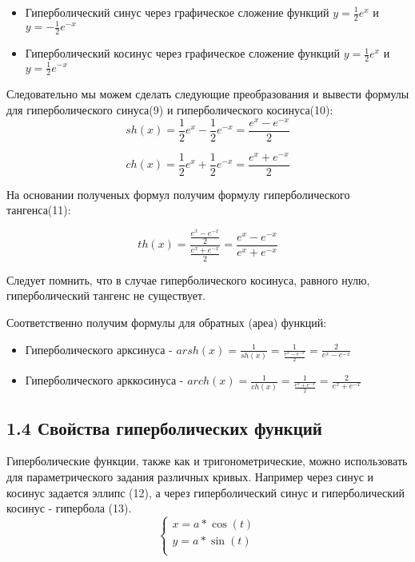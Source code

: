 \documentclass{article}
\begin{document}
\begin{itemize}
    \item Гиперболический синус через графическое сложение функций $y=\frac{1}{2}e^x$ и $y=-\frac{1}{2}e^{-x}$
    \item Гиперболический косинус через графическое сложение функций $y=\frac{1}{2}e^x$ и $y=\frac{1}{2}e^{-x}$
\end{itemize}

Следовательно мы можем сделать следующие преобразования и вывести формулы для гиперболического синуса(9) и гиперболического косинуса(10):
\begin{equation}
    sh(x) = \frac{1}{2}e^x - \frac{1}{2}e^{-x} = \frac{e^x-e^{-x}}{2}
 \end{equation}

 \begin{equation}
    ch(x) = \frac{1}{2}e^x + \frac{1}{2}e^{-x} = \frac{e^x+e^{-x}}{2}
 \end{equation}

 На основании полученых формул получим формулу гиперболического тангенса(11):

 \begin{equation}
    th(x) = \frac{\frac{e^x-e^{-x}}{2}}{\frac{e^x+e^{-x}}{2}} = \frac{e^x-e^{-x}}{e^x+e^{-x}}
 \end{equation}

Следует помнить, что в случае гиперболического косинуса, равного нулю, гиперболический тангенс не существует.

Соответственно получим формулы для обратных (ареа) функций:

\begin{itemize}
    \item Гиперболического арксинуса - $arsh(x) = \frac{1}{sh(x)} = \frac{1}{\frac{e^x-e^{-x}}{2}} = \frac{2}{e^x-e^{-x}}$
    \item Гиперболического арккосинуса - $arch(x) = \frac{1}{ch(x)} = \frac{1}{\frac{e^x+e^{-x}}{2}} = \frac{2}{e^x+e^{-x}}$
\end{itemize}
\subsection*{1.4 Свойства гиперболических функций}
Гиперболические функции, также как и тригонометрические, можно использовать для параметрического задания различных кривых. Например через синус и косинус задается эллипс (12), а через гиперболический синус и гиперболический косинус - гипербола (13).
\begin{equation}
    \begin{cases}
        x = a * \cos(t)\\
        y = a * \sin(t)\\
    \end{cases}
\end{equation}
\end{document}
